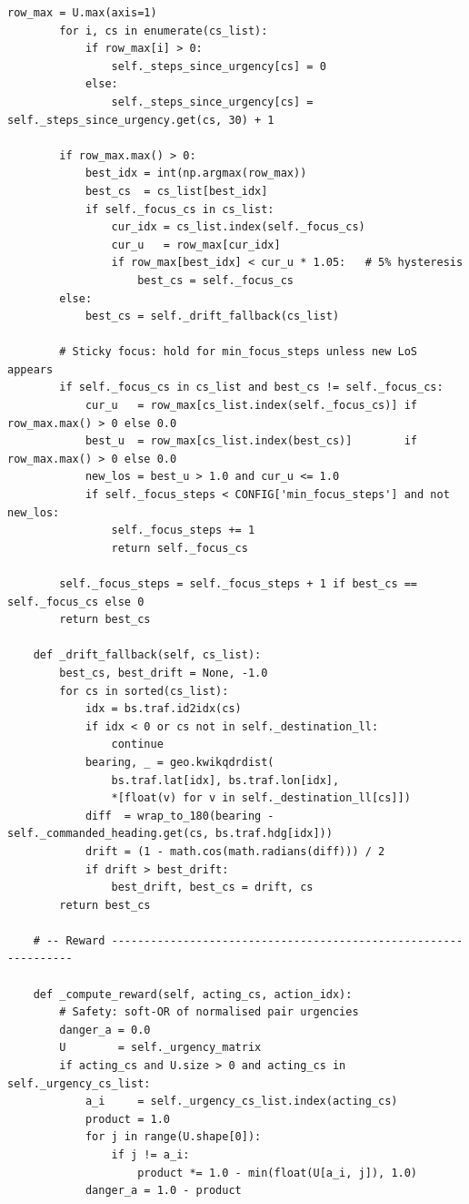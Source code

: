 \documentclass[10pt, a4paper]{article}
\begin{document}
\begin{lstlisting}[caption={v3\_simple\_env.py --- ATCO conflict-resolution environment}, label=lst:env]
        row_max = U.max(axis=1)
        for i, cs in enumerate(cs_list):
            if row_max[i] > 0:
                self._steps_since_urgency[cs] = 0
            else:
                self._steps_since_urgency[cs] = self._steps_since_urgency.get(cs, 30) + 1

        if row_max.max() > 0:
            best_idx = int(np.argmax(row_max))
            best_cs  = cs_list[best_idx]
            if self._focus_cs in cs_list:
                cur_idx = cs_list.index(self._focus_cs)
                cur_u   = row_max[cur_idx]
                if row_max[best_idx] < cur_u * 1.05:   # 5% hysteresis
                    best_cs = self._focus_cs
        else:
            best_cs = self._drift_fallback(cs_list)

        # Sticky focus: hold for min_focus_steps unless new LoS appears
        if self._focus_cs in cs_list and best_cs != self._focus_cs:
            cur_u   = row_max[cs_list.index(self._focus_cs)] if row_max.max() > 0 else 0.0
            best_u  = row_max[cs_list.index(best_cs)]        if row_max.max() > 0 else 0.0
            new_los = best_u > 1.0 and cur_u <= 1.0
            if self._focus_steps < CONFIG['min_focus_steps'] and not new_los:
                self._focus_steps += 1
                return self._focus_cs

        self._focus_steps = self._focus_steps + 1 if best_cs == self._focus_cs else 0
        return best_cs

    def _drift_fallback(self, cs_list):
        best_cs, best_drift = None, -1.0
        for cs in sorted(cs_list):
            idx = bs.traf.id2idx(cs)
            if idx < 0 or cs not in self._destination_ll:
                continue
            bearing, _ = geo.kwikqdrdist(
                bs.traf.lat[idx], bs.traf.lon[idx],
                *[float(v) for v in self._destination_ll[cs]])
            diff  = wrap_to_180(bearing - self._commanded_heading.get(cs, bs.traf.hdg[idx]))
            drift = (1 - math.cos(math.radians(diff))) / 2
            if drift > best_drift:
                best_drift, best_cs = drift, cs
        return best_cs

    # -- Reward ----------------------------------------------------------------

    def _compute_reward(self, acting_cs, action_idx):
        # Safety: soft-OR of normalised pair urgencies
        danger_a = 0.0
        U        = self._urgency_matrix
        if acting_cs and U.size > 0 and acting_cs in self._urgency_cs_list:
            a_i     = self._urgency_cs_list.index(acting_cs)
            product = 1.0
            for j in range(U.shape[0]):
                if j != a_i:
                    product *= 1.0 - min(float(U[a_i, j]), 1.0)
            danger_a = 1.0 - product


\end{lstlisting}
\end{document}
